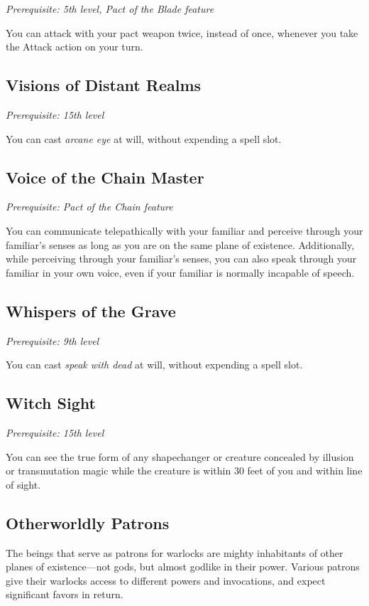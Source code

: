 \textit{Prerequisite: 5th level, Pact of the Blade feature}

You can attack with your pact weapon twice, instead of once, whenever you take the Attack action on your turn.

\subsection{Visions of Distant Realms}

\textit{Prerequisite: 15th level}

You can cast \textit{arcane eye} at will, without expending a spell slot.

\subsection{Voice of the Chain Master}

\textit{Prerequisite: Pact of the Chain feature}

You can communicate telepathically with your familiar and perceive through your familiar's senses as long as you are on the same plane of existence. Additionally, while perceiving through your familiar's senses, you can also speak through your familiar in your own voice, even if your familiar is normally incapable of speech.

\subsection{Whispers of the Grave}

\textit{Prerequisite: 9th level}

You can cast \textit{speak with dead} at will, without expending a spell slot.

\subsection{Witch Sight}

\textit{Prerequisite: 15th level}

You can see the true form of any shapechanger or creature concealed by illusion or transmutation magic while the creature is within 30 feet of you and within line of sight.

\subsection{Otherworldly Patrons}

The beings that serve as patrons for warlocks are mighty inhabitants of other planes of existence—not gods, but almost godlike in their power. Various patrons give their warlocks access to different powers and invocations, and expect significant favors in return.

